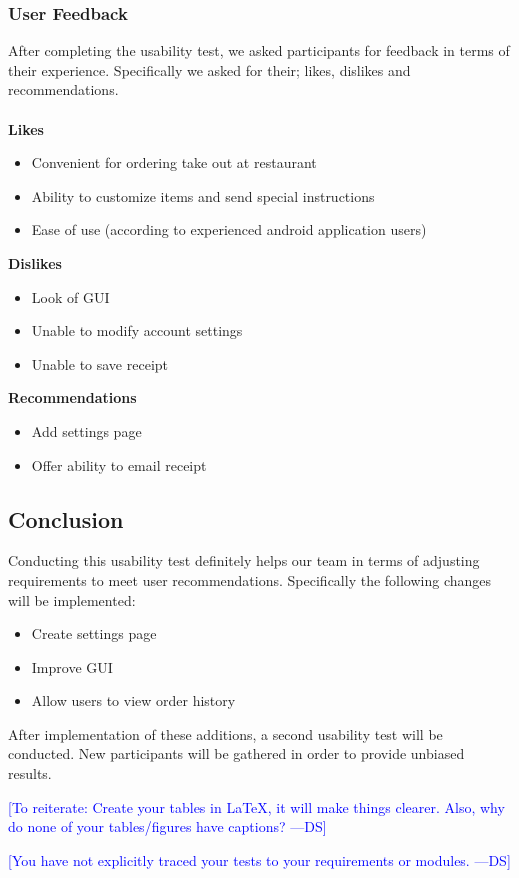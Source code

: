 \documentclass[12pt, titlepage]{article}
\newcommand{\authornote}[3]{\textcolor{#1}{[#3 ---#2]}}
\newcommand{\authornote}[3]{}
\newcommand{\ds}[1]{\authornote{blue}{DS}{#1}}
\begin{document}
\subsubsection{User Feedback}

After completing the usability test, we asked participants for feedback in terms of their experience. Specifically we asked for their; likes, dislikes and recommendations. 
\\\\
\textbf{Likes} 
\begin{itemize}
\item Convenient for ordering take out at restaurant  
\item Ability to customize items and send special instructions
\item Ease of use (according to experienced android application users)
\end{itemize}
\textbf{Dislikes}
\begin{itemize}
\item Look of GUI
\item Unable to modify account settings
\item Unable to save receipt 
\end{itemize}
\textbf{Recommendations}  
\begin{itemize}
\item Add settings page
\item Offer ability to email receipt
\end{itemize}
\subsection{Conclusion}
Conducting this usability test definitely helps our team in terms of adjusting requirements to meet user recommendations. Specifically the following changes will be implemented: 
\begin{itemize}
\item Create settings page
\item Improve GUI
\item Allow users to view order history
\end{itemize}
After implementation of these additions, a second usability test will be conducted. New participants will be gathered in order to provide unbiased results. 

\ds{To reiterate: Create your tables in \LaTeX{}, it will make things clearer. Also,
why do none of your tables/figures have captions?}

\ds{You have not explicitly traced your tests to your requirements or modules.}
\end{document}
